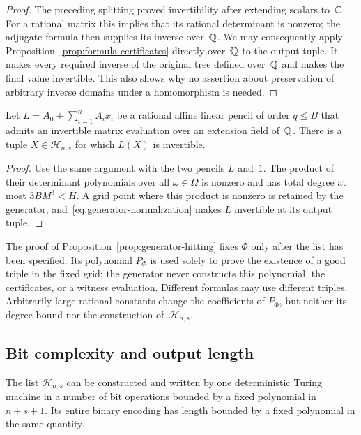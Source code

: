 \begin{proof}
The preceding splitting proved invertibility after extending
scalars to~$\mathbb C$. For a rational matrix this implies that its rational
determinant is nonzero; the adjugate formula then supplies its
inverse over~$\mathbb Q$. We may consequently apply
Proposition~\ref{prop:formula-certificates} directly over~$\mathbb Q$ to the
output tuple. It makes every required inverse of the original tree
defined over~$\mathbb Q$ and makes the final value invertible. This also
shows why no assertion about preservation of arbitrary inverse
domains under a homomorphism is needed.
\end{proof}

\begin{corollary}
\label{cor:pencil-hitting}
Let $L=A_0+\sum_{i=1}^n A_i x_i$ be a rational affine linear pencil
of order $q\le B$ that admits an invertible matrix evaluation over
an extension field of~$\mathbb Q$. There is a tuple
$X\in\mathcal H_{n,s}$ for which $L(X)$ is invertible.
\end{corollary}

\begin{proof}
Use the same argument with the two pencils $L$ and~$1$.
The product of their determinant polynomials over all
$\omega\in\Omega$ is nonzero and has total degree at most
$3BM^3<H$. A grid point where this product is nonzero is retained
by the generator, and~\eqref{eq:generator-normalization} makes
$L$ invertible at its output tuple.
\end{proof}

The proof of Proposition~\ref{prop:generator-hitting} fixes $\Phi$
only after the list has been specified. Its
polynomial $P_\Phi$ is used solely to prove the existence of a good
triple in the fixed grid; the generator never constructs this
polynomial, the certificates, or a witness evaluation. Different
formulas may use different triples. Arbitrarily large rational
constants change the coefficients of $P_\Phi$, but neither its
degree bound nor the construction of~$\mathcal H_{n,s}$.

\subsection{Bit complexity and output length}

\begin{proposition}
\label{prop:generator-complexity}
The list $\mathcal H_{n,s}$ can be constructed and written by one
deterministic Turing machine in a number of bit operations bounded
by a fixed polynomial in $n+s+1$. Its entire binary encoding has
length bounded by a fixed polynomial in the same quantity.
\end{proposition}

